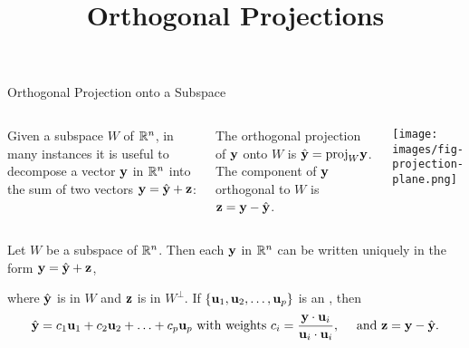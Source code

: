 \documentclass[xcolor=dvipsnames,aspectratio=169,t]{beamer}
\title{Orthogonal Projections}
\begin{document}
\maketitle

\begin{frame}{Orthogonal Projection onto a Subspace}
  \medskip

  \begin{columns}[T]
  \column{0.7\tw}
  Given a subspace $W$ of $\mathbb{R}^n$, in many instances it is useful to decompose a vector $\mathbf{y}$ in $\mathbb{R}^n$ into the sum of two vectors $\mathbf{y} = \hat{\mathbf{y}} + \mathbf{z}$:%
  \medskip
  
  \bi
  \ii  The \alert{orthogonal projection of $\mathbf{y}$ onto $W$} is $\hat{\mathbf{y}}=\mbox{proj}_W \mathbf{y}$.
  \smallskip
  \ii The \alert{component of $\mathbf{y}$ orthogonal to $W$} is $\mathbf{z} = \mathbf{y} - \hat{\mathbf{y}}$.
  \ei

  \column{0.3\tw}
  \texttt{[image: images/fig-projection-plane.png]}
  \end{columns}
  \bigskip

  \pause
  \begin{theorem}
  Let $W$ be a subspace of $\mathbb{R}^n$.
  Then each $\mathbf{y}$ in $\mathbb{R}^n$ can be written \alert{uniquely} in the form  $\mathbf{y} = \hat{\mathbf{y}} + \mathbf{z}$,
  \smallskip
  
  where $\hat{\mathbf{y}}$ is in $W$ and $\mathbf{z}$ is in $W^{\perp}$.
  If $\left\{ \mathbf{u}_1, \mathbf{u}_2, \ldots , \mathbf{u}_p \right\}$ is an , then
  \[ \hat{\mathbf{y}} = c_1 \mathbf{u}_1 + c_2 \mathbf{u}_2 + \ldots + c_p \mathbf{u}_p \mbox{ with weights } c_i = \frac{\mathbf{y} \cdot \mathbf{u}_i}{\mathbf{u}_i \cdot \mathbf{u}_i}, \quad \mbox{ and } \mathbf{z} = \mathbf{y} - \hat{\mathbf{y}}.\]
  \end{theorem}
\end{frame}
\end{document}

